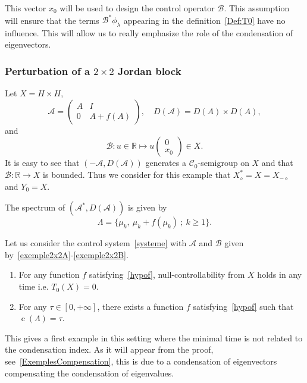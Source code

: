 \documentclass[AHL,Unicode,longabstracts]{cedram}
\newcommand\A{\mathcal{A}}
\newcommand\As{\mathcal{A}^*}
\newcommand\B{\mathcal{B}}
\newcommand{\DA}{D(\A)}
\newcommand{\Xalphas}{X_\diamond^*}
\newcommand{\Xmalpha}{X_{-\diamond}}
\newcommand{\Fzp}{Y_0}
\newcommand{\R}{\mathbb{R}}
\DeclareMathOperator{\cond}{c}
\newcommand*{\romanenumi}{\renewcommand*{\theenumi}{\roman{enumi}}}
\begin{document}
\begin{rema}
This vector $x_0$ will be used to design the control operator $\B$. This assumption will ensure that the terms $\B^* \phi_\lambda$ appearing in the definition~\eqref{Def:T0} have no influence. This will allow us to really emphasize the role of the condensation of eigenvectors.
\end{rema}

\subsubsection{Perturbation of a \texorpdfstring{$2 \times 2$}{2x2} Jordan block}\label{secexample2x2}

Let $X=H \times H$,
\begin{equation}\label{exemple2x2A}
\A=
\begin{pmatrix} A & I \\ 0 & A+f(A)
\end{pmatrix},
\quad
\DA=D(A)\times D(A),
\end{equation}
and
\begin{equation}\label{exemple2x2B}
\B : u \in \R \mapsto u
\begin{pmatrix} 0\\ x_0
\end{pmatrix} \in X.
\end{equation}
It is easy to see that $(-\A,\DA)$ generates a $\mathcal C_0$-semigroup on $X$ and that $\B:\R\to X$ is bounded. Thus we consider for this example that $\Xalphas = X = \Xmalpha$ and $\Fzp=X$.

The spectrum of $(\As, \DA)$ is given by
\[
\Lambda = \{ \mu_k, \: \mu_k+f(\mu_k) \: ; \: k \geq 1\}.
\]

\begin{prop}\label{Prop:Academique1}
Let us consider the control system~\eqref{systeme} with $\A$ and $\B$ given by~\eqref{exemple2x2A}-\eqref{exemple2x2B}.
\begin{enumerate}\romanenumi
\item \label{prop5.2.1} For any function $f$ satisfying~\eqref{hypof}, null-controllability from $X$ holds in any time i.e. $T_0(X)=0$.
\smallskip
\item \label{prop5.2.2}For any $\tau \in [0,+\infty]$, there exists a function $f$ satisfying~\eqref{hypof} such that $\cond(\Lambda)= \tau$.
\end{enumerate}
\end{prop}

This gives a first example in this setting where the minimal time is not related to the condensation index. As it will appear from the proof, see~\eqref{ExemplesCompensation}, this is due to a condensation of eigenvectors compensating the condensation of eigenvalues.
\end{document}
